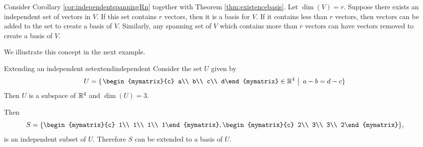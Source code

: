 Consider Corollary \ref{cor:independentspanningRn} together with Theorem \ref{thm:existencebasis}. Let $\dim(V) = r$. Suppose there exists an independent set of vectors in $V$. If this set contains $r$ vectors, then it is a basis for $V$. If it contains less than $r$ vectors, then vectors can be added to the set to create a basis of $V$. Similarly, any spanning set of $V$ which contains more than $r$ vectors can have vectors removed to create a basis of $V$.

We illustrate this concept in the next example.

\begin{example}{Extending an independent set}{extendindependent}
Consider the set $U$ given by 
\[ U=\set{\left.\begin{mymatrix}{c} a\\ b\\ c\\ d\end{mymatrix}
\in\R^4 ~\right|~ a-b=d-c }\]
Then $U$ is a subspace of $\mathbb{R}^4$ and $\dim(U)=3$.

Then
\[S=\set{
\begin{mymatrix}{c} 1\\ 1\\ 1\\ 1\end{mymatrix},
\begin{mymatrix}{c} 2\\ 3\\ 3\\ 2\end{mymatrix} },\]
is an independent subset of $U$.
Therefore $S$ can be extended to a basis of $U$.
\end{example}

